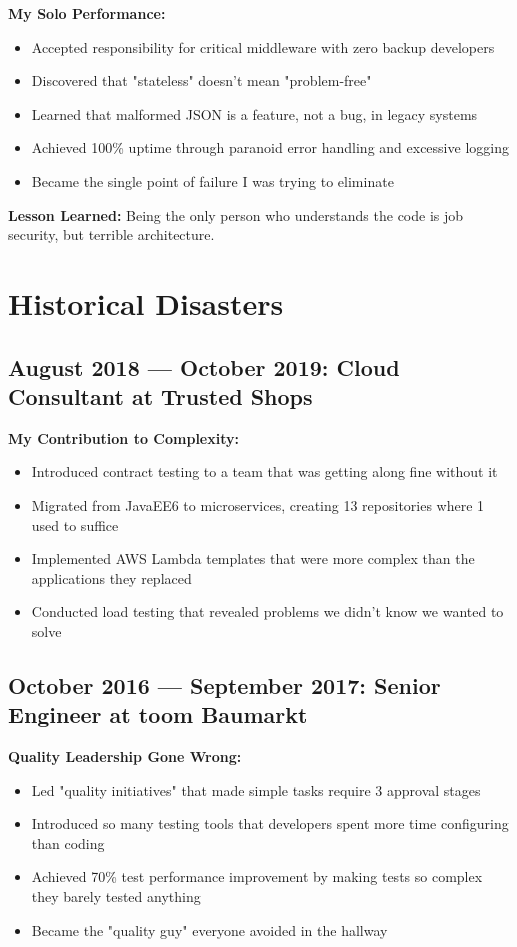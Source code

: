 \documentclass[10pt,a4paper]{article}
\begin{document}
\textbf{My Solo Performance:}
\begin{itemize}[leftmargin=1em,topsep=0pt,itemsep=0pt]
\item Accepted responsibility for critical middleware with zero backup developers
\item Discovered that "stateless" doesn't mean "problem-free"
\item Learned that malformed JSON is a feature, not a bug, in legacy systems
\item Achieved 100\% uptime through paranoid error handling and excessive logging
\item Became the single point of failure I was trying to eliminate
\end{itemize}

\textbf{Lesson Learned:} Being the only person who understands the code is job security, but terrible architecture.

\section*{Historical Disasters}

\subsection*{August 2018 — October 2019: Cloud Consultant at Trusted Shops}
\textbf{My Contribution to Complexity:}
\begin{itemize}[leftmargin=1em,topsep=0pt,itemsep=0pt]
\item Introduced contract testing to a team that was getting along fine without it
\item Migrated from JavaEE6 to microservices, creating 13 repositories where 1 used to suffice
\item Implemented AWS Lambda templates that were more complex than the applications they replaced
\item Conducted load testing that revealed problems we didn't know we wanted to solve
\end{itemize}

\subsection*{October 2016 — September 2017: Senior Engineer at toom Baumarkt}
\textbf{Quality Leadership Gone Wrong:}
\begin{itemize}[leftmargin=1em,topsep=0pt,itemsep=0pt]
\item Led "quality initiatives" that made simple tasks require 3 approval stages
\item Introduced so many testing tools that developers spent more time configuring than coding
\item Achieved 70\% test performance improvement by making tests so complex they barely tested anything
\item Became the "quality guy" everyone avoided in the hallway
\end{itemize}
\end{document}

